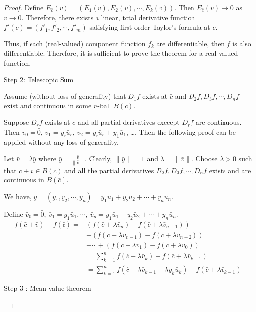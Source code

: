 \begin{proof}
Define $E_{\bar{c}}(\bar{v}) = \left( E_1(\bar{v}), E_2(\bar{v}), \cdots, E_k(\bar{v}) \right)$.
Then $E_{\bar{c}}(\bar{v}) \to \bar{0}$ as $\bar{v} \to \bar{0}$.
Therefore, there exists a linear, total derivative function $f'(\bar{c}) = \left( f'_1, f'_2, \cdots, f'_m \right)$ satisfying first-order Taylor's formula at $\bar{c}$.

Thus, if each (real-valued) component function $f_k$ are differentiable, then $f$ is also differentiable.
Therefore, it is sufficient to prove the theorem for a real-valued function.\\
\begin{commentary}Step 2: Telescopic Sum\end{commentary}

Assume (without loss of generality) that $D_1f$ exists at $\bar{c}$ and $D_2f,D_3f,\cdots,D_nf$ exist and continuous in some $n$-ball $B(\bar{c})$.
\begin{commentary} Suppose $D_rf$ exists at $\bar{c}$ and all partial derivatives execept $D_rf$ are continuous.
	Then $v_0 = \bar{0}$, $v_1 = y_r\bar{u}_r$, $v_2 = y_r\bar{u}_r + y_1\bar{u}_1$, \dots.
Then the following proof can be applied without any loss of generality.
\end{commentary}

Let $\bar{v} = \lambda\bar{y}$ where $\bar{y} = \frac{\bar{v}}{\|\bar{v}\|}$.
Clearly, $\|\bar{y}\| = 1$ and $\lambda = \| \bar{v} \|$.
Choose $\lambda > 0$ such that $\bar{c}+\bar{v} \in B(\bar{c})$ and all the partial derivatives $D_2f, D_3f, \cdots, D_nf$ exists and are continuous in $B(\bar{c})$.

	We have, $\bar{y} = (y_1, y_2, \cdots, y_n) = y_1 \bar{u}_1 + y_2 \bar{u}_2 + \cdots + y_n \bar{u}_n$.

	Define $\bar{v}_0 = \bar{0},\ \bar{v}_1 = y_1\bar{u}_1, \cdots, \ \bar{v}_n = y_1 \bar{u}_1 + y_2 \bar{u}_2 + \cdots + y_n \bar{u}_n$.
\begin{align*}
	f(\bar{c}+\bar{v}) - f(\bar{c}) = & ( f(\bar{c}+\lambda{} \bar{v}_n) - f(\bar{c}+\lambda{} \bar{v}_{n-1}) ) \\
	& + ( f(\bar{c}+\lambda{} \bar{v}_{n-1}) - f(\bar{c}+\lambda{} \bar{v}_{n-2}) ) \\
	& + \cdots + ( f(\bar{c}+\lambda{} \bar{v}_1) - f(\bar{c}+\lambda{} \bar{v}_0) ) \\
	& = \sum_{k = 1}^n f(\bar{c} + \lambda{} \bar{v}_k) - f(\bar{c} + \lambda{} \bar{v}_{k-1}) \\
	& = \sum_{k = 1}^n f(\bar{c} + \lambda{} \bar{v}_{k-1} + \lambda{} y_k \bar{u}_k) - f(\bar{c} + \lambda{} \bar{v}_{k-1})
\end{align*}
\begin{commentary}Step 3 : Mean-value theorem\end{commentary}


\end{proof}
